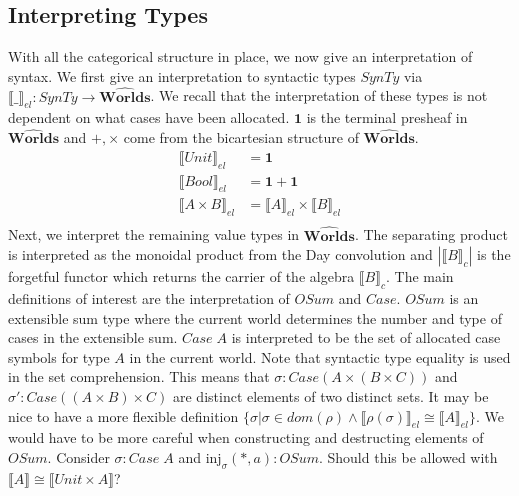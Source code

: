 \documentclass{article}
\newcommand{\injj}[2]{\textrm{inj}_{#1}#2}
\newcommand{\worlds}{\widehat{\mathbf{Worlds}}}
\begin{document}
\subsection{Interpreting Types}
With all the categorical structure in place, we now give an interpretation of syntax. We first give an interpretation to syntactic types $SynTy$ via $\llbracket\_\rrbracket_{el} : SynTy \rightarrow \worlds$. We recall that the interpretation of these types is not dependent on what cases have been allocated. $\mathbf{1}$ is the terminal presheaf in $\worlds$ and $+,\times$ come from the bicartesian structure of $\worlds$.
\begin{align*}
    \llbracket Unit \rrbracket_{el} &= \mathbf{1}\\
    \llbracket Bool \rrbracket_{el} &= \mathbf{1}  + \mathbf{1}\\
    \llbracket A \times B \rrbracket_{el} &= \llbracket A \rrbracket_{el} \times \llbracket B \rrbracket_{el} \\
\end{align*}
Next, we interpret the remaining value types in $\worlds$. The separating product is interpreted as the monoidal product from the Day convolution and $| \llbracket B \rrbracket_c |$ is the forgetful functor which returns the carrier of the algebra $\llbracket B \rrbracket_c$. The main definitions of interest are the interpretation of $OSum$ and $Case$. $OSum$ is an extensible sum type where the current world determines the number and type of cases in the extensible sum. $Case \;A$ is interpreted to be the set of allocated case symbols for type $A$ in the current world. Note that syntactic type equality is used in the set comprehension. This means that $\sigma : Case (A \times (B \times C))$ and $\sigma' : Case((A \times B) \times C)$ are distinct elements of two distinct sets. It may be nice to have a more flexible definition $\{ \sigma | \sigma \in dom(\rho) \land \llbracket \rho(\sigma) \rrbracket_{el} \cong \llbracket A \rrbracket_{el}\}$. We would have to be more careful when constructing and destructing elements of $OSum$. Consider $\sigma : Case \;A$ and $\injj{\sigma}{(*,a)}: OSum$. Should this be allowed with $\llbracket A \rrbracket \cong \llbracket Unit \times A \rrbracket$?
\end{document}
